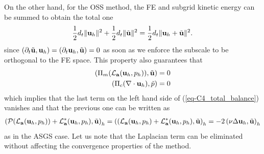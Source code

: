 On the other hand, for the OSS method, the FE and subgrid kinetic energy can be summed to obtain the total one
\begin{align}
\label{eq-C4_time_deriv_OSS}
\frac{1}{2}d_t\|{\bf u}_h\|^2+\frac{1}{2}d_t\|\tilde{{\bf u}}\|^2=\frac{1}{2}d_t\|{\bf u}_h+\tilde{{\bf u}}\|^2.
\end{align}
since $(\partial_t\tilde{{\bf u}},{\bf u}_h)=(\partial_t{\bf u}_h,\tilde{{\bf u}})=0$ as soon as we enforce the subscale to be orthogonal to the FE space. This property also guarantees that%
\begin{align}
\label{eq-C4_Pi_tau_sgs}
\left(\Pi_m(\mathcal{L}_{{\bf a}}({\bf u}_h,p_h)),\tilde{{\bf u}}\right) = 0 \\
\left(\Pi_c(\nabla\cdot{\bf u}_h),\tilde{p}\right)=0
\end{align}
which implies that the last term on the left hand side of (\ref{eq-C4_total_balance}) vanishes and that the previous one can be written as
\begin{align}
\left(\mathcal{P}(\mathcal{L}_{{\bf a}}({\bf u}_h,p_h))+\mathcal{L}^*_{{\bf a}}({\bf u}_h,p_h),\tilde{{\bf u}}\right)_h
= \left( (\mathcal{L}_{{\bf a}}({\bf u}_h,p_h)+\mathcal{L}^*_{{\bf a}}({\bf u}_h,p_h),\tilde{{\bf u}}\right)_h
=-2 \left(\nu\Delta{\bf u}_h,\tilde{{\bf u}}\right)_h
\end{align}
as in the ASGS case. Let us note that the Laplacian term can be eliminated without affecting the convergence properties of the method. 
